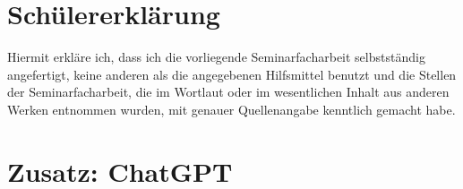 \documentclass[11pt]{article}
\begin{document}
\section*{Schülererklärung}
Hiermit erkläre ich, dass ich die vorliegende Seminarfacharbeit selbstständig angefertigt,
keine anderen als die angegebenen Hilfsmittel benutzt und die Stellen der Seminarfacharbeit,
die im Wortlaut oder im wesentlichen Inhalt aus anderen Werken entnommen wurden,
mit genauer Quellenangabe kenntlich gemacht habe.

\section{Zusatz: ChatGPT}
\end{document}
